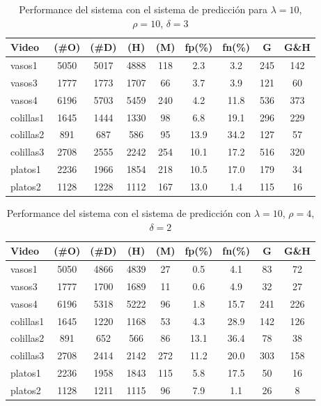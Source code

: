 \begin{table}[htb]
  \begin{tabular}{|l | c | c | c | c | c | c | c | c |}
	\hline  
	\textbf{Video} & \textbf{(\#O)} &  \textbf{(\#D)} & \textbf{(H)} & \textbf{(M)} & \textbf{fp(\%)} & \textbf{fn(\%)} & \textbf{G} & \textbf{G\&H} \\
	\hline
	\hline
	vasos1 & 5050 & 5017 & 4888 & 118 & 2.3 & 3.2  & 245 & 142\\
	vasos3 & 1777 & 1773 & 1707 & 66 & 3.7 & 3.9 & 121 & 60 \\
	vasos4 & 6196 & 5703 & 5459 & 240 & 4.2 & 11.8 & 536 & 373 \\
	\hline
	colillas1 & 1645 & 1444 & 1330 & 98 & 6.8 & 19.1 & 296 & 229 \\
	colillas2 & 891 & 687 & 586 & 95 & 13.9 & 34.2 & 127 & 57 \\
	colillas3 & 2708 & 2555 & 2242 & 254 & 10.1 & 17.2  & 516 & 320\\
	\hline
	platos1 & 2236 & 1966 & 1854 & 218 & 10.5 & 17.0 & 179 & 34\\
	platos2 & 1128 & 1228 & 1112 & 167& 13.0 & 1.4 & 115 & 16\\
	\hline
	\end{tabular}
	\caption{\label{tab:pred} Performance del sistema con el sistema de predicción para 
	$\lambda=10$, $\rho=10$, $\delta=3$ }
\end{table}

\begin{table}[htb]
  \begin{tabular}{|l | c | c | c | c | c | c | c | c |}
	\hline  
	\textbf{Video} & \textbf{(\#O)} &  \textbf{(\#D)} & \textbf{(H)} & \textbf{(M)} & \textbf{fp(\%)} & \textbf{fn(\%)} & \textbf{G} & \textbf{G\&H} \\
	\hline
	\hline
	vasos1 & 5050 & 4866 & 4839 & 27 & 0.5 & 4.1  & 83 & 72\\
	vasos3 & 1777 & 1700 & 1689 & 11 & 0.6 & 4.9 & 32 & 27 \\
	vasos4 & 6196 & 5318 & 5222 & 96 & 1.8 & 15.7 & 241 & 226 \\
	\hline
	colillas1 & 1645 & 1220 & 1168 & 53 & 4.3 & 28.9 & 142 & 126 \\
	colillas2 & 891 & 652 & 566 & 86 & 13.1 & 36.4 & 78 & 38 \\
	colillas3 & 2708 & 2414 & 2142 & 272 & 11.2 & 20.0 & 303 & 158 \\
	\hline
	platos1 & 2236 & 1958 & 1843 & 115 & 5.8 & 17.5 & 50 & 16 \\
	platos2 & 1128 & 1211 & 1115 & 96 & 7.9 & 1.1 & 26 & 8 \\
	\hline
	\end{tabular}
	\caption{\label{tab:pred_2} Performance del sistema con el sistema de predicción con
	$\lambda=10$, $\rho=4$, $\delta=2$}
\end{table}

